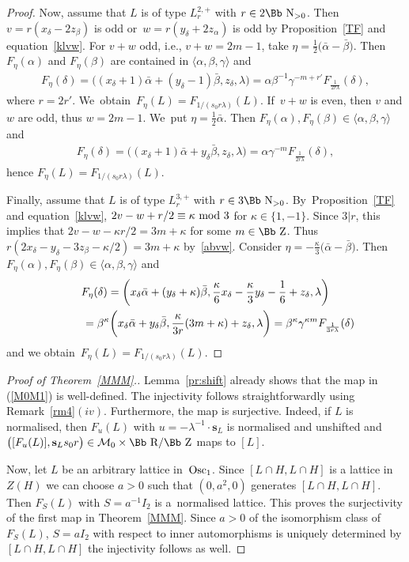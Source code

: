 \documentclass[10pt,a4paper]{amsart}
\newcommand\RR{{\mbox{\Bb R}}}
\newcommand\NN{{\mbox{\Bb N}}}
\newcommand\ZZ{{\mbox{\Bb Z}}}
\newcommand\cM{{\mathcal M}}
\newcommand{\Osc}{{\rm Osc}}
\newcommand\la{\langle}
\newcommand\ra{\rangle}
\numberwithin{equation}{section}
\begin{document}
\begin{proof}
Now, assume that $L$ is of type $L^{2,+}_{r}$ with $r\in 2\NN_{>0}$.
Then $v=r(x_\delta-2z_\beta)$ is odd or~$w=r(y_\delta+2z_\alpha)$ is odd by Proposition~\ref{TF} and equation~\eqref{klvw}.
For $v+w$ odd, i.e., $v+w=2m-1$, take $\eta=\frac{1}{2}\big(\bar\alpha-\bar\beta\big)$.
Then $F_\eta(\alpha)$ and $F_\eta(\beta)$ are contained in $\la \alpha,\beta,\gamma\ra$ and
\begin{gather*}
F_\eta(\delta)=\big((x_\delta+1)\bar\alpha+(y_\delta-1)\bar\beta, z_\delta,\lambda\big)=\alpha\beta^{-1}\gamma^{-m+r'}F_{\frac1{2r\lambda}}(\delta),
\end{gather*}
where $r=2r'$. We~obtain~$F_\eta(L)=F_{1/(s_0r\lambda)}(L)$. If~$v+w$ is even, then $v$ and $w$ are odd, thus $w=2m-1$. We~put $\eta=\frac{1}{2}\bar\alpha$. Then $F_\eta(\alpha), F_\eta(\beta) \in\la \alpha,\beta,\gamma\ra$ and
\begin{gather*}
F_\eta(\delta)=\big((x_\delta+1)\bar\alpha+y_\delta\bar\beta, z_\delta,\lambda\big)=\alpha\gamma^{-m}F_{\frac1{2r\lambda}}(\delta),
\end{gather*}
hence $F_\eta(L)=F_{1/(s_0r\lambda)}(L)$.

Finally, assume that $L$ is of type $L^{3,+}_{r}$ with $r\in 3\NN_{>0}$. By~Proposition~\ref{TF} and equation~\eqref{klvw}, $2v-w+r/2\equiv \kappa\ {\rm mod}\ 3$ for $\kappa\in\{1,-1\}$. Since $3|r$, this implies that $2v-w-\kappa r/2=3m+\kappa$ for some $m\in\ZZ$.
Thus $r(2x_\delta-y_\delta -3z_\beta-\kappa/2)=3m+\kappa$ by~\eqref{abvw}.
Consider $\eta=-\frac{\kappa}{3}\big(\bar\alpha-\bar\beta\big)$.
Then $F_\eta(\alpha), F_\eta(\beta) \in\la \alpha,\beta,\gamma\ra$ and
\begin{gather*}
F_\eta(\delta)=\bigg(x_\delta\bar\alpha+(y_\delta+\kappa)\bar\beta, \frac\kappa6 x_\delta-\frac\kappa3 y_\delta-\frac16+z_\delta ,\lambda\bigg)
\\ \hphantom{F_\eta(\delta)}
{}= \beta^\kappa \bigg(x_\delta\bar\alpha+y_\delta\bar\beta, \frac\kappa{3r}(3m+\kappa)+z_\delta ,\lambda\bigg)
= \beta^\kappa\gamma^{\kappa m}F_{\frac 1{3r\lambda}}(\delta)
\end{gather*}
and we obtain~$F_\eta(L)=F_{1/(s_0r\lambda)}(L)$.
\end{proof}

\begin{proof}[Proof of Theorem~\ref{MMM}.]
Lemma~\ref{pr:shift} already shows that the map in (\ref{M0M1}) is well-defined. The injectivity follows straightforwardly using Remark~\ref{rm4}$(iv)$. Furthermore, the map is surjective. Indeed, if $L$ is normalised, then $F_u(L)$ with $u=-\lambda^{-1}\cdot\textbf{s}_L$ is normalised and unshifted and $\big([F_u(L)],\textbf{s}_L s_0 r\big)\in\cM_0\times\RR/\ZZ$ maps to $[L]$.

Now, let $L$ be an arbitrary lattice in~$\Osc_1$.
Since $[L\cap H,L\cap H]$ is a lattice in~$Z(H)$ we can choose $a>0$ such that $(0,a^2,0)$ generates $[L\cap H,L\cap H]$.
Then $F_S(L)$ with $S={a}^{-1}I_2$ is a~normalised lattice. This proves the surjectivity of the first map in Theorem~\ref{MMM}. Since $a>0$ of the isomorphism class of~$F_S(L)$, $S=aI_2$ with respect to inner automorphisms is uniquely determined by $[L\cap H,L\cap H]$ the injectivity follows as well.
\end{proof}
\end{document}
